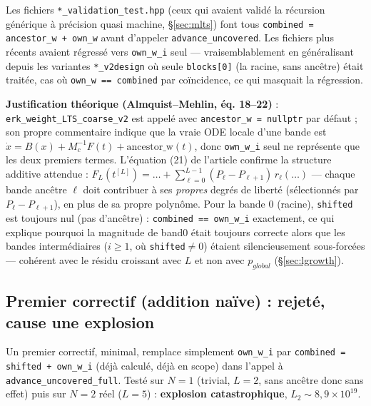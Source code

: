 \documentclass[11pt]{article}
\begin{document}
Les fichiers \texttt{*\_validation\_test.hpp} (ceux qui avaient validé
la récursion générique à précision quasi machine, \S\ref{sec:mlts}) font
tous \texttt{combined = ancestor\_w + own\_w} avant d'appeler
\texttt{advance\_uncovered}. Les fichiers plus récents avaient régressé
vers \texttt{own\_w\_i} seul --- vraisemblablement en généralisant depuis
les variantes \texttt{*\_v2design} où seule \texttt{blocks[0]} (la
racine, sans ancêtre) était traitée, cas où \texttt{own\_w == combined}
par coïncidence, ce qui masquait la régression.

\textbf{Justification théorique (Almquist--Mehlin, éq. 18--22)} :
\texttt{erk\_weight\_LTS\_coarse\_v2} est appelé avec
\texttt{ancestor\_w = nullptr} par défaut ; son propre commentaire
indique que la vraie ODE locale d'une bande est
$\dot x = B(x) + M_c^{-1}F(t) + \text{ancestor\_w}(t)$, donc
\texttt{own\_w\_i} seul ne représente que les deux premiers termes.
L'équation (21) de l'article confirme la structure additive attendue :
$F_L(t^{[L]}) = \dots + \sum_{\ell=0}^{L-1}(P_\ell-P_{\ell+1})\,
r_\ell(\dots)$ --- chaque bande ancêtre $\ell$ doit contribuer à ses
\emph{propres} degrés de liberté (sélectionnés par $P_\ell-P_{\ell+1}$),
en plus de sa propre polynôme. Pour la bande 0 (racine), \texttt{shifted}
est toujours nul (pas d'ancêtre) : \texttt{combined == own\_w\_i}
exactement, ce qui explique pourquoi la magnitude de band0 était
toujours correcte alors que les bandes intermédiaires ($i\geq1$, où
\texttt{shifted}$\neq0$) étaient silencieusement sous-forcées ---
cohérent avec le résidu croissant avec $L$ et non avec $p_{global}$
(\S\ref{sec:lgrowth}).

\subsection{Premier correctif (addition naïve) : rejeté, cause une
explosion}
\label{sec:naivefail}

Un premier correctif, minimal, remplace simplement \texttt{own\_w\_i}
par \texttt{combined = shifted + own\_w\_i} (déjà calculé, déjà en
scope) dans l'appel à \texttt{advance\_uncovered\_full}. Testé sur
$N=1$ (trivial, $L=2$, sans ancêtre donc sans effet) puis sur $N=2$
réel ($L=5$) : \textbf{explosion catastrophique},
$L_2\sim8{,}9\times10^{19}$.
\end{document}
